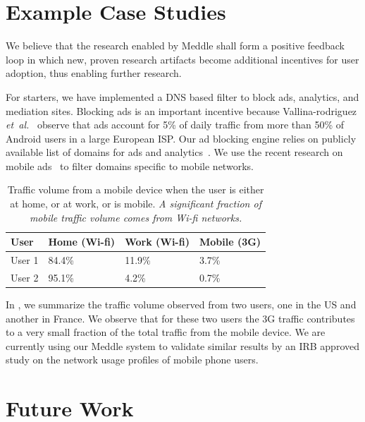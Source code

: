 \documentclass{sig-alternate-10pt}
\newcommand{\etal}{\emph{et~al.}}
\newcommand{\meddle}{{Meddle}\xspace}
\renewcommand{\fref}{\Fref}
\begin{document}
\section{Example Case Studies}

We believe that the research enabled by \meddle shall form a positive
feedback loop in which new, proven research artifacts become
additional incentives for user adoption, thus enabling further
research.   

For starters, we have implemented a DNS based filter to block ads,
analytics, and mediation sites. Blocking ads is an important incentive
because Vallina-rodriguez \etal~\cite{Vallina-rodriguez:2012:AdCache}
observe that ads account for 5\% of daily traffic from more than 50\%
of Android users in a large European ISP. Our ad blocking engine
relies on publicly available list of domains for ads and
analytics~\cite{YoyoAds}. We use the recent research on mobile
ads~\cite{Leontiadis:2012:AdsMobile, hornyack:appfence} to filter
domains specific to mobile networks.

\begin{table}
\centering
\begin{tabular}{|l|l|l|l|}
\hline
{\bf User} & {\bf Home (Wi-fi)} & {\bf Work (Wi-fi)} & {\bf Mobile (3G)} \\
\hline
User 1 & 84.4\% & 11.9\% & 3.7\% \\
\hline
User 2 & 95.1\% & 4.2\% & 0.7\% \\
\hline
\end{tabular}
\caption{Traffic volume from a mobile device when the user is either
  at home, or at work, or is mobile. \emph{A significant fraction of
    mobile traffic volume comes from Wi-fi networks.}}  
\label{tab:Usage}
\end{table}

In \fref{tab:Usage}, we summarize the traffic volume observed from two
users, one in the US and another in France. We observe that for these
two users the 3G traffic contributes to a very small fraction of the
total traffic from the mobile device. We are currently using our
\meddle system to validate similar results by an IRB approved study on
the network usage profiles of mobile phone users. 

\section{Future Work}
\end{document}
